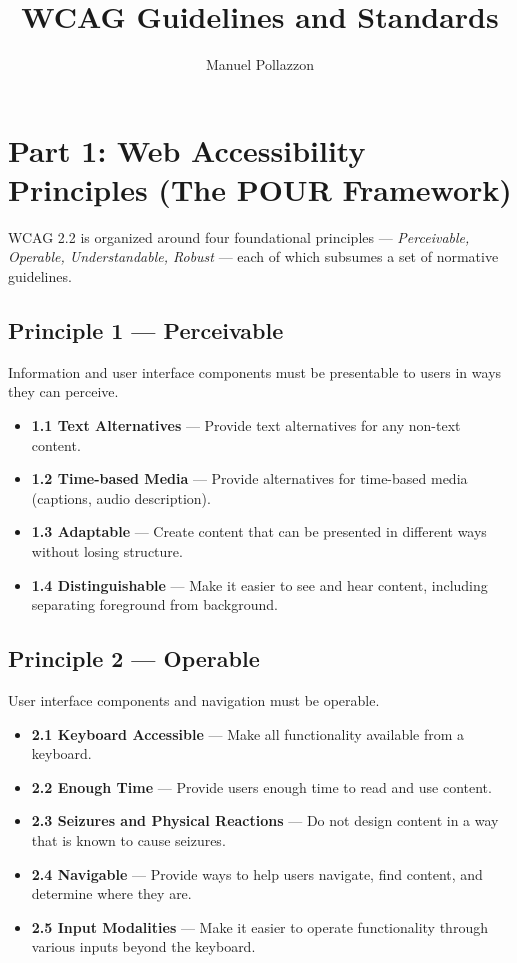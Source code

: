 \documentclass[11pt,a4paper]{article}
\title{WCAG Guidelines and Standards}
\author{Manuel Pollazzon}
\date{}
\begin{document}
\maketitle

\section{Part 1: Web Accessibility Principles (The POUR Framework)}

WCAG 2.2 is organized around four foundational principles ---
\emph{Perceivable, Operable, Understandable, Robust} --- each of which
subsumes a set of normative guidelines.

\subsection{Principle 1 --- Perceivable}
Information and user interface components must be presentable to users in ways
they can perceive.
\begin{itemize}
  \item \textbf{1.1 Text Alternatives} --- Provide text alternatives for any
        non-text content.
  \item \textbf{1.2 Time-based Media} --- Provide alternatives for time-based
        media (captions, audio description).
  \item \textbf{1.3 Adaptable} --- Create content that can be presented in
        different ways without losing structure.
  \item \textbf{1.4 Distinguishable} --- Make it easier to see and hear
        content, including separating foreground from background.
\end{itemize}

\subsection{Principle 2 --- Operable}
User interface components and navigation must be operable.
\begin{itemize}
  \item \textbf{2.1 Keyboard Accessible} --- Make all functionality available
        from a keyboard.
  \item \textbf{2.2 Enough Time} --- Provide users enough time to read and use
        content.
  \item \textbf{2.3 Seizures and Physical Reactions} --- Do not design content
        in a way that is known to cause seizures.
  \item \textbf{2.4 Navigable} --- Provide ways to help users navigate, find
        content, and determine where they are.
  \item \textbf{2.5 Input Modalities} --- Make it easier to operate
        functionality through various inputs beyond the keyboard.
\end{itemize}
\end{document}
